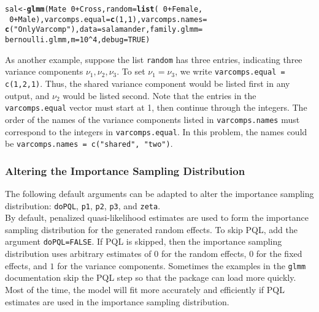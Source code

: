 \documentclass[11pt]{article}\usepackage[]{graphicx}\usepackage[]{color}
\makeatletter
\newcommand{\hlnum}[1]{\textcolor[rgb]{0.686,0.059,0.569}{#1}}%
\newcommand{\hlstr}[1]{\textcolor[rgb]{0.192,0.494,0.8}{#1}}%
\newcommand{\hlopt}[1]{\textcolor[rgb]{0,0,0}{#1}}%
\newcommand{\hlstd}[1]{\textcolor[rgb]{0.345,0.345,0.345}{#1}}%
\newcommand{\hlkwb}[1]{\textcolor[rgb]{0.69,0.353,0.396}{#1}}%
\newcommand{\hlkwc}[1]{\textcolor[rgb]{0.333,0.667,0.333}{#1}}%
\newcommand{\hlkwd}[1]{\textcolor[rgb]{0.737,0.353,0.396}{\textbf{#1}}}%
\newenvironment{kframe}{%
 \def\at@end@of@kframe{}%
 \ifinner\ifhmode%
  \def\at@end@of@kframe{\end{minipage}}%
  \begin{minipage}{\columnwidth}%
 \fi\fi%
 \def\FrameCommand##1{\hskip\@totalleftmargin \hskip-\fboxsep
 \colorbox{shadecolor}{##1}\hskip-\fboxsep
     \hskip-\linewidth \hskip-\@totalleftmargin \hskip\columnwidth}%
 \MakeFramed {\advance\hsize-\width
   \@totalleftmargin\z@ \linewidth\hsize
   \@setminipage}}%
 {\par\unskip\endMakeFramed%
 \at@end@of@kframe}
\newenvironment{knitrout}{}{} %
\makeatother
\begin{document}
\begin{knitrout}
\color{fgcolor}\begin{kframe}
\begin{alltt}
\hlstd{sal} \hlkwb{<-} \hlkwd{glmm}\hlstd{(Mate} \hlopt{~} \hlnum{0} \hlopt{+} \hlstd{Cross,} \hlkwc{random} \hlstd{=} \hlkwd{list}\hlstd{(}\hlopt{~} \hlnum{0} \hlopt{+} \hlstd{Female,}
\hlopt{~} \hlnum{0} \hlopt{+} \hlstd{Male),} \hlkwc{varcomps.equal} \hlstd{=} \hlkwd{c}\hlstd{(} \hlnum{1}\hlstd{,} \hlnum{1}\hlstd{),} \hlkwc{varcomps.names} \hlstd{=}
\hlkwd{c}\hlstd{(}\hlstr{"Only Varcomp"}\hlstd{),} \hlkwc{data} \hlstd{= salamander,} \hlkwc{family.glmm} \hlstd{=}
\hlstd{bernoulli.glmm,} \hlkwc{m} \hlstd{=} \hlnum{10}\hlopt{^}\hlnum{4}\hlstd{,} \hlkwc{debug} \hlstd{=} \hlnum{TRUE}\hlstd{)}
\end{alltt}
\end{kframe}
\end{knitrout}
As another example, suppose the list \texttt{random} has three entries, indicating three variance components $\nu_1, \nu_2, \nu_3$. To set $\nu_1= \nu_3$, we write \texttt{varcomps.equal = c(1,2,1)}. Thus, the shared variance component would be listed first in any output, and $\nu_2$ would be listed second. Note that the entries in the \texttt{varcomps.equal} vector must start at 1, then continue through the integers. The order of the names of the variance components listed in \texttt{varcomps.names} must correspond to the integers in \texttt{varcomps.equal}. In this problem, the names could be \texttt{varcomps.names = c("shared", "two")}.  \\




\subsubsection{Altering the Importance Sampling Distribution}
The following default arguments can be adapted to alter the importance sampling distribution: \texttt{doPQL}, \texttt{p1}, \texttt{p2}, \texttt{p3}, and \texttt{zeta}.\\

By default, penalized quasi-likelihood estimates are used to form the importance sampling distribution for the generated random effects.  To skip PQL, add the argument \texttt{doPQL=FALSE}. If PQL is skipped, then the importance sampling distribution uses arbitrary estimates of $0$ for the random effects, $0$ for the fixed effects, and $1$ for the variance components. Sometimes the examples in the \texttt{glmm} documentation  skip the PQL step so that the package can load more quickly. Most of the time, the model will fit more accurately and efficiently if PQL estimates are used in the importance sampling distribution.\\
\end{document}
